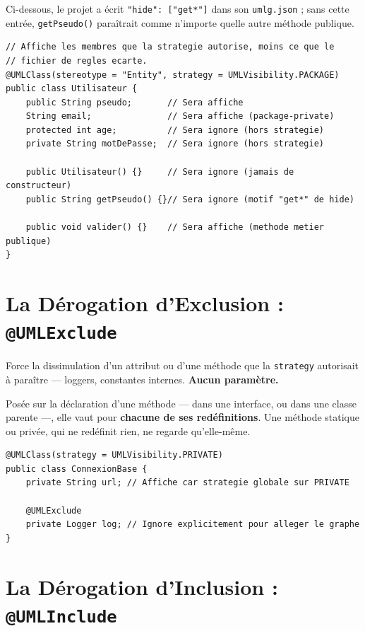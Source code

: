 \documentclass[12pt, a4paper]{article}
\begin{document}
Ci-dessous, le projet a écrit \texttt{"hide": ["get*"]} dans son \texttt{umlg.json} ; sans cette entrée, \texttt{getPseudo()} paraîtrait comme n'importe quelle autre méthode publique.
\begin{lstlisting}
// Affiche les membres que la strategie autorise, moins ce que le
// fichier de regles ecarte.
@UMLClass(stereotype = "Entity", strategy = UMLVisibility.PACKAGE)
public class Utilisateur {
    public String pseudo;       // Sera affiche
    String email;               // Sera affiche (package-private)
    protected int age;          // Sera ignore (hors strategie)
    private String motDePasse;  // Sera ignore (hors strategie)

    public Utilisateur() {}     // Sera ignore (jamais de constructeur)
    public String getPseudo() {}// Sera ignore (motif "get*" de hide)

    public void valider() {}    // Sera affiche (methode metier publique)
}
\end{lstlisting}

\section{La Dérogation d'Exclusion : \texttt{@UMLExclude}}

Force la dissimulation d'un attribut ou d'une méthode que la \texttt{strategy} autorisait à paraître --- loggers, constantes internes. \textbf{Aucun paramètre.}

Posée sur la déclaration d'une méthode --- dans une interface, ou dans une classe parente ---, elle vaut pour \textbf{chacune de ses redéfinitions}. Une méthode statique ou privée, qui ne redéfinit rien, ne regarde qu'elle-même.

\begin{lstlisting}
@UMLClass(strategy = UMLVisibility.PRIVATE)
public class ConnexionBase {
    private String url; // Affiche car strategie globale sur PRIVATE

    @UMLExclude
    private Logger log; // Ignore explicitement pour alleger le graphe
}
\end{lstlisting}

\section{La Dérogation d'Inclusion : \texttt{@UMLInclude}}
\end{document}
